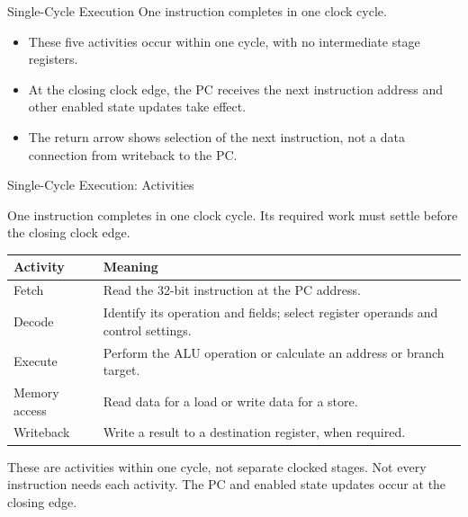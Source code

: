 \documentclass[aspectratio=169,11pt,t]{beamer}
\newcommand{\code}[1]{\texttt{#1}}
\begin{document}
\begin{frame}{Single-Cycle Execution}
One instruction completes in one clock cycle.
\vspace{.35cm}
\begin{center}
\end{center}
\vspace{.3cm}
\begin{itemize}\setlength{\itemsep}{7pt}
\item These five activities occur within one cycle, with no intermediate stage registers.
\item At the closing clock edge, the PC receives the next instruction address and other enabled state updates take effect.
\item The return arrow shows selection of the next instruction, not a data connection from writeback to the PC.
\end{itemize}
\end{frame}


\begin{frame}{Single-Cycle Execution: Activities}

\small
One instruction completes in one clock cycle. Its required work must settle before the closing clock edge.
\begin{center}
\renewcommand{\arraystretch}{1.2}
\begin{tabular}{lp{10.8cm}}
\toprule
\rowcolor{white}
\textbf{Activity} & \textbf{Meaning} \\
\midrule
Fetch & Read the 32-bit instruction at the PC address. \\
Decode & Identify its operation and fields; select register operands and control settings. \\
Execute & Perform the ALU operation or calculate an address or branch target. \\
Memory access & Read data for a load or write data for a store. \\
Writeback & Write a result to a destination register, when required. \\
\bottomrule
\end{tabular}
\end{center}

These are activities within one cycle, not separate clocked stages. Not every instruction needs each activity. The PC and enabled state updates occur at the closing edge.

\end{frame}
\end{document}
